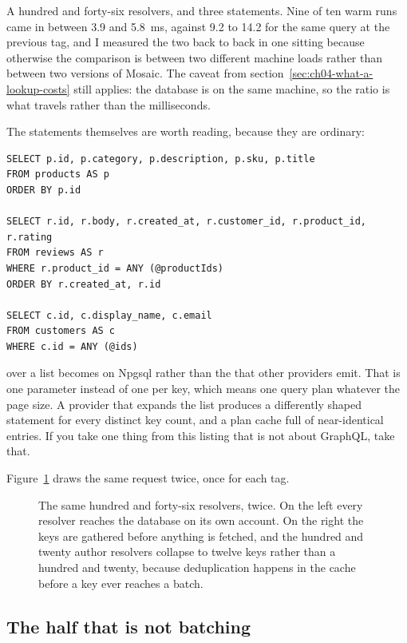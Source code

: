 A hundred and forty-six resolvers, and three statements. Nine of ten warm runs
came in between 3.9 and 5.8~ms, against 9.2 to 14.2 for the same query at the
previous tag, and I measured the two back to back in one sitting because
otherwise the comparison is between two different machine loads rather than
between two versions of Mosaic. The caveat from
section~\ref{sec:ch04-what-a-lookup-costs} still applies: the database is on the
same machine, so the ratio is what travels rather than the milliseconds.

The statements themselves are worth reading, because they are ordinary:

\begin{verbatim}
SELECT p.id, p.category, p.description, p.sku, p.title
FROM products AS p
ORDER BY p.id

SELECT r.id, r.body, r.created_at, r.customer_id, r.product_id, r.rating
FROM reviews AS r
WHERE r.product_id = ANY (@productIds)
ORDER BY r.created_at, r.id

SELECT c.id, c.display_name, c.email
FROM customers AS c
WHERE c.id = ANY (@ids)
\end{verbatim}

%
 over a list becomes  on Npgsql rather than
the  that other providers emit. That is one parameter
instead of one per key, which means one query plan whatever the page size. A
provider that expands the list produces a differently shaped statement for every
distinct key count, and a plan cache full of near-identical entries. If you take
one thing from this listing that is not about GraphQL, take that.

Figure~\ref{fig:ch04-batching} draws the same request twice, once for each tag.

\begin{figure}[htbp]
  \centering
  
  \caption{The same hundred and forty-six resolvers, twice. On the left every
  resolver reaches the database on its own account. On the right the keys are
  gathered before anything is fetched, and the hundred and twenty author
  resolvers collapse to twelve keys rather than a hundred and twenty, because
  deduplication happens in the cache before a key ever reaches a batch.}
  \label{fig:ch04-batching}
\end{figure}

\subsection*{The half that is not batching}

